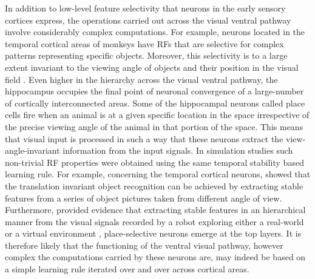 In addition to low-level feature selectivity that neurons in the early
sensory cortices express, the operations carried out across the visual
ventral pathway involve considerably complex computations. For example,
neurons located in the temporal cortical areas of monkeys have RFs that are
selective for complex patterns representing specific objects. Moreover,
this selectivity is to a large extent invariant to the viewing angle of
objects and their position in the visual field \citep{gross1972a,
rolls2006a}. Even higher in the hierarchy across the visual ventral
pathway, the hippocampus occupies the final point of neuronal convergence
of a large-number of cortically interconnected areas. Some of the
hippocampal neurons called place cells \citep{okeefe1971a} fire when an
animal is at a given specific location in the space irrespective of the
precise viewing angle of the animal in that portion of the space. This
means that visual input is processed in such a way that these neurons
extract the view-angle-invariant information from the input signals. In
simulation studies such non-trivial RF properties were obtained using the
same temporal stability based learning rule. For example, concerning the
temporal cortical neurons, \cite{einhauser2005a} showed that the
translation invariant object recognition can be achieved by extracting
stable features from a series of object pictures taken from different angle
of view. Furthermore, \cite{wyss2006a,franzius2007a} provided evidence that
extracting stable features in an hierarchical manner from the visual
signals recorded by a robot exploring either a real-world \citep{wyss2006a}
or a virtual environment \citep{franzius2007a}, place-selective neurons
emerge at the top layers. It is therefore likely that the functioning of
the ventral visual pathway, however complex the computations carried by
these neurons are, may indeed be based on a simple learning rule iterated
over and over across cortical areas. 



